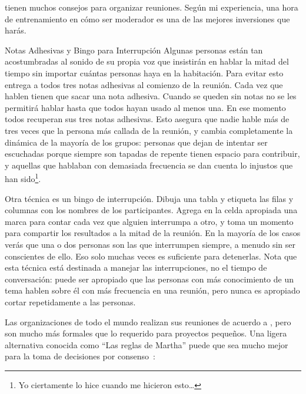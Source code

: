 \cite{Brow2007,Broo2016,Roge2018} tienen muchos consejos para organizar reuniones.
Según mi experiencia,
una hora de entrenamiento en cómo ser moderador
es una de las mejores inversiones que harás.

\begin{aside}{Notas Adhesivas y Bingo para Interrupción}
  Algunas personas están tan acostumbradas al sonido de su propia voz
  que insistirán en hablar la mitad del tiempo
  sin importar cuántas personas haya en la habitación.
  Para evitar esto
  entrega a todos tres notas adhesivas al comienzo de la reunión.
  Cada vez que hablen
  tienen que sacar una nota adhesiva.
  Cuando se queden sin notas
  no se les permitirá hablar hasta que todos hayan usado al menos una.
  En ese momento todos recuperan sus tres notas adhesivas.
  Esto asegura que nadie hable más de tres veces que
  la persona más callada de la reunión,
  y cambia completamente la dinámica de la mayoría de los grupos:
  personas que dejan de intentar ser escuchadas porque siempre son tapadas
  de repente tienen espacio para contribuir,
  y aquellas que hablaban con demasiada frecuencia se dan cuenta lo injustos que han sido\footnote{
    Yo ciertamente lo hice cuando me hicieron esto{\ldots}
  }.

  Otra técnica es un bingo de interrupción.
  Dibuja una tabla y etiqueta las filas y columnas con los nombres de los participantes.
  Agrega en la celda apropiada una marca para contar 
  cada vez que alguien interrumpa a otro,
  y toma un momento para compartir los resultados a la mitad de la reunión.
  En la mayoría de los casos
  verás que una o dos personas son las que interrumpen siempre,
  a menudo sin ser conscientes de ello.
  Eso solo muchas veces es suficiente para detenerlas.
  Nota que esta técnica está destinada a manejar las interrupciones,
  no el tiempo de conversación:
  puede ser apropiado que las personas con más conocimiento de un tema hablen sobre él  con más frecuencia en una reunión,
  pero nunca es apropiado cortar repetidamente a las personas.
\end{aside}


Las organizaciones de todo el mundo realizan sus reuniones de acuerdo a 
,
pero son mucho más formales que lo requerido para proyectos pequeños.
Una ligera alternativa conocida como ``Las reglas de Martha''
puede que sea mucho mejor para la toma de decisiones por consenso~\cite{Mina1986}:

